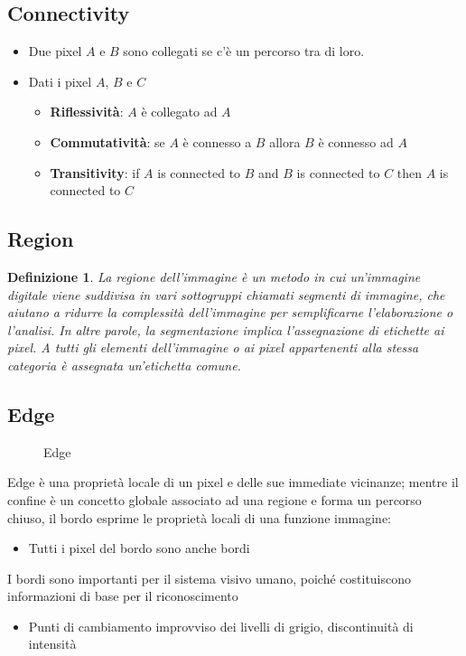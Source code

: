 \documentclass{report}
\newtheorem{defi}{Definizione}[section]
\begin{document}
\subsection{Connectivity}
\label{sec:conct}
\begin{itemize}
\item Due pixel $A$ e $B$ sono collegati se c'è un percorso tra di loro.
\item Dati i pixel $A$, $B$ e $C$
  \begin{itemize}
  \item \textbf{Riflessività}: $A$ è collegato ad $A$
  \item \textbf{Commutatività}: se $A$ è connesso a $B$ allora $B$ è
    connesso ad $A$
  \item \textbf{Transitivity}: if $A$ is connected to $B$ and $B$ is
    connected to $C$ then $A$ is connected to $C$
  \end{itemize}
\end{itemize}

\subsection{Region}
\label{sec:region}

\begin{defi}
  La regione dell'immagine è un metodo in cui un'immagine digitale viene
  suddivisa in vari sottogruppi chiamati segmenti di immagine, che
  aiutano a ridurre la complessità dell'immagine per semplificarne
  l'elaborazione o l'analisi. In altre parole, la segmentazione implica
  l'assegnazione di etichette ai pixel. A tutti gli elementi
  dell'immagine o ai pixel appartenenti alla stessa categoria è
  assegnata un'etichetta comune.
\end{defi}

\subsection{Edge}
\label{sec:edge}
\begin{figure}[ht!]
  \centering
  \resizebox{5cm}{!}{
    }
  \caption{Edge}
  \label{fig:edge}
\end{figure}
Edge è una proprietà locale di un pixel e delle sue immediate vicinanze;
mentre il confine è un concetto globale associato ad una regione e
forma un percorso chiuso, il bordo esprime le proprietà locali di una
funzione immagine:
\begin{itemize}
\item Tutti i pixel del bordo sono anche bordi
\end{itemize}
I bordi sono importanti per il sistema visivo umano, poiché costituiscono informazioni di base per il riconoscimento
\begin{itemize}
\item Punti di cambiamento improvviso dei livelli di grigio, discontinuità di intensità
\end{itemize}
\end{document}
